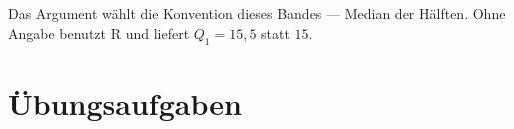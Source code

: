 \begin{technik}
\begin{center}
\begin{minipage}{0.82\textwidth}
\\
\\
\end{minipage}
\end{center}

Das Argument  wählt die Konvention dieses Bandes --- Median der Hälften. Ohne Angabe benutzt R  und liefert $Q_1 = 15{,}5$ statt $15$.
\end{technik}

\section{Übungsaufgaben}

